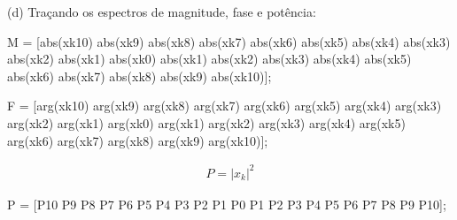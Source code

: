 \documentclass{article}
\begin{document}
\newpage

(d) Traçando os espectros de magnitude, fase e potência:

\vspace{\baselineskip}

M = [abs(xk10) abs(xk9) abs(xk8) abs(xk7) abs(xk6) abs(xk5) abs(xk4) abs(xk3) abs(xk2) abs(xk1) abs(xk0) abs(xk1) abs(xk2) abs(xk3) abs(xk4) abs(xk5) abs(xk6) abs(xk7) abs(xk8) abs(xk9) abs(xk10)];

\vspace{\baselineskip}

F = [arg(xk10) arg(xk9) arg(xk8) arg(xk7) arg(xk6) arg(xk5) arg(xk4) arg(xk3) arg(xk2) arg(xk1) arg(xk0) arg(xk1) arg(xk2) arg(xk3) arg(xk4) arg(xk5) arg(xk6) arg(xk7) arg(xk8) arg(xk9) arg(xk10)];

\begin{align*}
    P = |x_{k}|^2
\end{align*}

P = [P10 P9 P8 P7 P6 P5 P4 P3 P2 P1 P0 P1 P2 P3 P4 P5 P6 P7 P8 P9 P10];

\vspace{\baselineskip}
\end{document}
